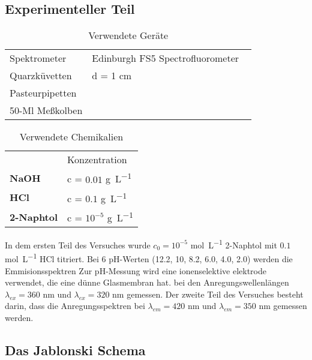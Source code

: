 \documentclass[12pt]{article}
\begin{document}
\subsection{Experimenteller Teil}

\begin{table}[!ht]
  \begin{tabular}{ll}
    Spektrometer & Edinburgh FS5 Spectrofluorometer ~\supercite{edin}   \\
    Quarzküvetten & d = 1 \si{\centi\meter}   \\
    Pasteurpipetten & \\
    50-Ml Meßkolben &    \\
  \end{tabular}
  \caption{Verwendete Geräte}
\end{table}

\begin{table}[!ht]
  \begin{tabular}{ll}
    &Konzentration\\ 
    \textbf{NaOH} & c = $0.01$ \si{\gram\per\liter}   \\
    \textbf{HCl} & c = $0.1$ \si{\gram\per\liter}   \\
    \textbf{2-Naphtol} & c = $10^{-5}$ \si{\gram\per\liter}   \\
  \end{tabular}
  \caption{Verwendete Chemikalien}
\end{table}

In dem ersten Teil des Versuches wurde $c_0 = 10^{-5}$ \si{\mol\per\liter} 2-Naphtol mit $0.1$ 
\si{\mol\per\liter} HCl titriert. Bei 6 pH-Werten (12.2, 10, 8.2, 6.0, 4.0, 2.0) werden die Emmisionsspektren 
Zur pH-Messung wird eine ionenselektive elektrode verwendet, die eine dünne Glasmembran hat.   
bei den Anregungswellenlängen $\lambda_{ex}=360$ \si{\nano\meter} und $\lambda_{ex}=320$ \si{\nano\meter} gemessen.
Der zweite Teil des Versuches besteht darin, dass die Anregungsspektren bei  
$\lambda_{em}=420$ \si{\nano\meter} und $\lambda_{em}=350$ \si{\nano\meter} gemessen werden.

\subsection{Das Jablonski Schema} %
\label{sub:jablonski_schema}
\end{document}
